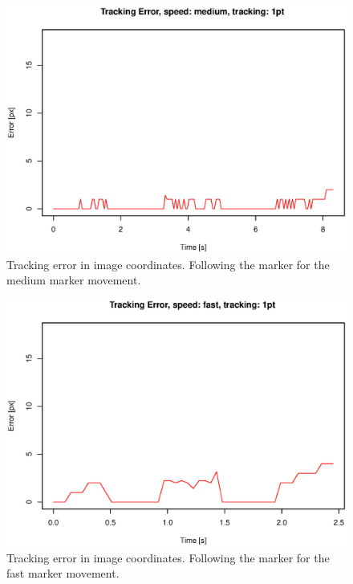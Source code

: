 \begin{figure}[H]
\centering
\includegraphics[width= \fullImageWidth]{graphics/robotics/trackingError_medium_1pt}
\caption{Tracking error in image coordinates.
Following the marker for the medium marker movement.}
\label{fig:trackingerror_medium_1p}
\end{figure}


\begin{figure}[H]
\centering
\includegraphics[width= \fullImageWidth]{graphics/robotics/trackingError_fast_1pt}
\caption{Tracking error in image coordinates.
Following the marker for the fast marker movement.}
\label{fig:trackingerror_fast_1p}
\end{figure}



